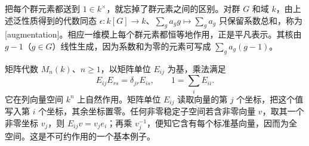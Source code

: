 把每个群元素都送到 \(1\in k^\times\)，就忘掉了群元素之间的区别。对群 \(G\) 和域 \(k\)，由上述泛性质得到的代数同态 \(\epsilon:k[G]\to k\)、\(\sum_g a_g g\mapsto\sum_g a_g\) 只保留系数总和，称为[augmentation]。相应一维模上每个群元素都恒等地作用，正是平凡表示。其核由 \(g-1\)（\(g\in G\)）线性生成，因为系数和为零的元素可写成 \(\sum_g a_g(g-1)\)。

\ProseParagraphBreak
矩阵代数 \(M_n(k)\)、\(n\ge1\)，以矩阵单位 \(E_{ij}\) 为基，乘法满足
\[
	E_{ij}E_{rs}=\delta_{jr}E_{is},\qquad 1=\sum_iE_{ii}.
\]
它在列向量空间 \(k^n\) 上自然作用。矩阵单位 \(E_{ij}\) 读取向量的第 \(j\) 个坐标，把这个值写入第 \(i\) 个坐标，其余坐标置零。任何非零稳定子空间若含非零向量 \(v\)，取其一个非零坐标 \(v_j\)，则 \(E_{ij}v=v_j e_i\)；再乘 \(v_j^{-1}\)，便知它含有每个标准基向量，因而为全空间。这是不可约作用的一个基本例子。

